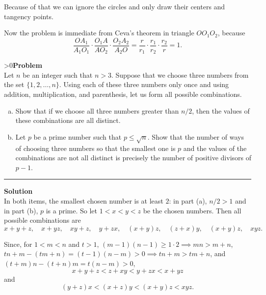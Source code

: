 \documentclass[12pt,oneside,a4paper]{book}
\newcounter{probnum}
\newcounter{solnum}
\newcommand{\prob}{\ifnum\value{probnum}>0\newpage\fi\setcounter{solnum}{0}\stepcounter{probnum}\textbf{Problem \theprobnum}\\}
\newcommand{\sol}{\medskip\hrule\medbreak\textbf{Solution}\\}
\begin{document}
Because of that we can ignore the circles and only draw their centers and tangency points.
\begin{center}
\end{center}

Now the problem is immediate from Ceva's theorem in triangle $OO_1O_2$, because
\[\frac{OA_1}{A_1O_1}\cdot\frac{O_1A}{AO_2}\cdot\frac{O_2A_2}{A_2O} = \frac{r}{r_1}\cdot\frac{r_1}{r_2}\cdot\frac{r_2}r=1.\]

\prob Let $n$ be an integer such that $n>3$. Suppose that we choose three numbers from the set $\{1,2,\ldots,n\}$. Using each of these three numbers only once and using addition, multiplication, and parenthesis, let us form all possible combinations.
\begin{enumerate}[(a)]
\item Show that if we choose all three numbers greater than $n/2$, then the values of these combinations are all distinct.
\item Let $p$ be a prime number such that $p\le \sqrt n$. Show that the number of ways of choosing three numbers so that the smallest one is $p$ and the values of the combinations are not all distinct is precisely the number of positive divisors of $p-1$.
\end{enumerate}

\sol
In both items, the smallest chosen number is at least $2$: in part (a), $n/2 > 1$ and in part (b), $p$ is a prime. So let $1<x<y<z$ be the chosen numbers. Then all possible combinations are
\[x+y+z,\quad x+yz,\quad xy+z,\quad y+zx,\quad (x+y)z,\quad (z+x)y,\quad (x+y)z, \quad xyz.\]

Since, for $1<m<n$ and $t>1$, $(m-1)(n-1) \ge 1\cdot 2\implies mn > m+n$, $tn + m - (tm+n) = (t-1)(n-m)>0\implies tn+m>tm+n$, and $(t+m)n - (t+n)m = t(n-m) > 0$,
\[x+y+z < z+xy < y+zx < x+yz\]
and
\[(y+z)x < (x+z)y < (x+y)z < xyz.\]
\end{document}

